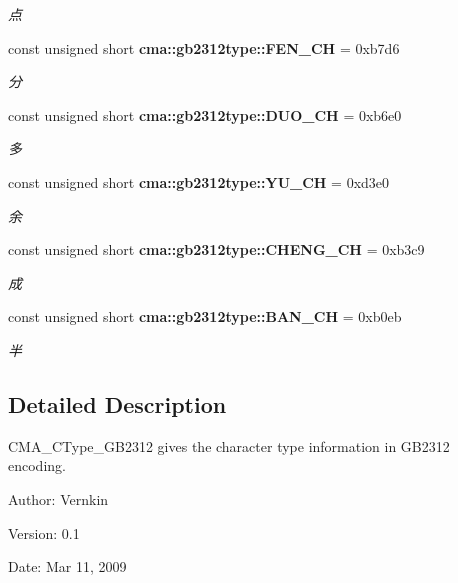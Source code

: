 \begin{CompactItemize}
\begin{CompactList}\small\item\em 点 \item\end{CompactList}\item 
const unsigned short {\bf cma::gb2312type::FEN\_\-CH} = 0xb7d6\label{namespacecma_1_1gb2312type_7742aecda5012381927b913f08321b58}

\begin{CompactList}\small\item\em 分 \item\end{CompactList}\item 
const unsigned short {\bf cma::gb2312type::DUO\_\-CH} = 0xb6e0\label{namespacecma_1_1gb2312type_72389d3fac67d40d030ddd29122066f0}

\begin{CompactList}\small\item\em 多 \item\end{CompactList}\item 
const unsigned short {\bf cma::gb2312type::YU\_\-CH} = 0xd3e0\label{namespacecma_1_1gb2312type_cbe5cc72fe68a17ca2b6b3d6d0123e44}

\begin{CompactList}\small\item\em 余 \item\end{CompactList}\item 
const unsigned short {\bf cma::gb2312type::CHENG\_\-CH} = 0xb3c9\label{namespacecma_1_1gb2312type_59704f9b146ddd85cdea099786e71762}

\begin{CompactList}\small\item\em 成 \item\end{CompactList}\item 
const unsigned short {\bf cma::gb2312type::BAN\_\-CH} = 0xb0eb\label{namespacecma_1_1gb2312type_1e107f05eafdd7317a1560c2a220be37}

\begin{CompactList}\small\item\em 半 \item\end{CompactList}\end{CompactItemize}


\subsection{Detailed Description}
CMA\_\-CType\_\-GB2312 gives the character type information in GB2312 encoding. 

\begin{Desc}
\item[Author:]Vernkin \end{Desc}
\begin{Desc}
\item[Version:]0.1 \end{Desc}
\begin{Desc}
\item[Date:]Mar 11, 2009 \end{Desc}
